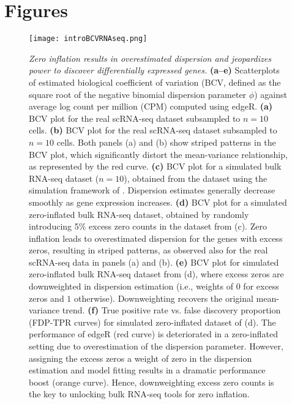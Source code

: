 \documentclass{bmcart}
\newcommand{\RPack}[1]{\textsf{#1}}
\begin{document}
\section*{Figures}


\begin{figure}[h!]
	\center
	\texttt{[image: introBCVRNAseq.png]}
	\caption{
{\em Zero inflation results in overestimated dispersion and jeopardizes power to discover differentially expressed genes.}
\textbf{(a--e)} 
Scatterplots of estimated biological coefficient of variation (BCV, defined as the square root of the negative binomial dispersion parameter $\phi$) against average log count per million (CPM) computed using \RPack{edgeR}.
\textbf{(a)} BCV plot for the real scRNA-seq \citet{Buettner2015} dataset subsampled to $n=10$ cells.
\textbf{(b)} BCV plot for the real scRNA-seq \citet{Deng2014} dataset subsampled to $n=10$ cells. Both panels (a) and (b) show striped patterns in the BCV plot, which significantly distort the mean-variance relationship, as represented by the red curve.
\textbf{(c)} BCV plot for a simulated bulk RNA-seq dataset ($n=10$), obtained from the \citet{Bottomly2011} dataset using the simulation framework of \citet{Zhou2014}. Dispersion estimates generally decrease smoothly as gene expression increases.
\textbf{(d)} BCV plot for a simulated zero-inflated bulk RNA-seq dataset, obtained by randomly introducing 5\% excess zero counts in the dataset from (c). Zero inflation leads to overestimated dispersion for the genes with excess zeros, resulting in striped patterns, as observed also for the real scRNA-seq data in panels (a) and (b).
\textbf{(e)} BCV plot for simulated zero-inflated bulk RNA-seq dataset from (d), where excess zeros are downweighted in dispersion estimation (i.e., weights of $0$ for excess zeros and $1$ otherwise). Downweighting recovers the original mean-variance trend.
\textbf{(f)} True positive rate vs. false discovery proportion (FDP-TPR curves) for simulated zero-inflated dataset of (d). The performance of \RPack{edgeR} (red curve) is deteriorated in a zero-inflated setting due to overestimation of the dispersion parameter. However, assigning the excess zeros a weight of zero in the dispersion estimation and model fitting results in a dramatic performance boost (orange curve). Hence, downweighting excess zero counts is the key to unlocking bulk RNA-seq tools for zero inflation.}
	\label{fig:introRNAseq}
\end{figure}
\end{document}
